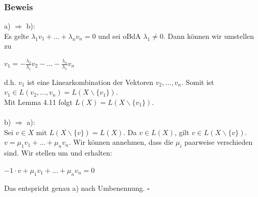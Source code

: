 \documentclass{article}
\begin{document}
\subsubsection*{Beweis}
a) $\Rightarrow$ b): \\
Es gelte $\lambda_1 v_1 + ... + \lambda_n v_n = 0$ und sei oBdA $\lambda_1 \neq 0$. Dann können wir umstellen zu \\
\begin{center}
    $v_1 = -\frac{\lambda_2}{\lambda_1} v_2 - ... - \frac{\lambda_n}{\lambda_1} v_n$ \\
\end{center}
d.h. $v_1$ ist eine Linearkombination der Vektoren $v_2,...,v_n$. Somit ist $v_1 \in L(v_2,...,v_n) = L(X\backslash \{v_1\})$. \\
Mit Lemma 4.11 folgt $L(X) = L(X\backslash \{v_1\})$. \\
\\
b) $\Rightarrow$ a): \\
Sei $v \in X$ mit $L(X\backslash \{v\}) = L(X)$. Da $v \in L(X)$, gilt $v \in L(X\backslash \{v\})$. \\
$v = \mu_1 v_1 + ... + \mu_n v_n$. Wir können annehmen, dass die $\mu_i$ paarweise verschieden sind. Wir stellen um und erhalten: \\
\begin{center}
    $-1 \cdot v + \mu_1 v_1 + ... + \mu_n v_n = 0$ \\
\end{center}
Das entspricht genau a) nach Umbenennung. $\square$ \\
\\
\end{document}
